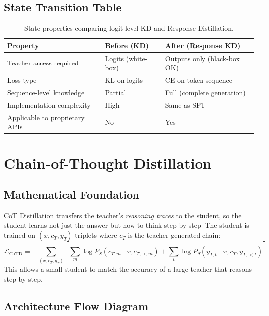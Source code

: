 \subsection{State Transition Table}
\begin{table}[h]\centering
\begin{tabular}{lll}\toprule
\textbf{Property} & \textbf{Before (KD)} & \textbf{After (Response KD)}\\\midrule
Teacher access required & Logits (white-box) & Outputs only (black-box OK)\\
Loss type & KL on logits & CE on token sequence\\
Sequence-level knowledge & Partial & Full (complete generation)\\
Implementation complexity & High & Same as SFT\\
Applicable to proprietary APIs & No & Yes\\\bottomrule
\end{tabular}
\caption{State properties comparing logit-level KD and Response Distillation.}
\end{table}

\newpage
\section{Chain-of-Thought Distillation}

\subsection{Mathematical Foundation}
CoT Distillation transfers the teacher's \emph{reasoning traces} to the student, so the student learns not just the answer but how to think step by step. The student is trained on $(x, c_T, y_T)$ triplets where $c_T$ is the teacher-generated chain:
\begin{equation}
  \mathcal{L}_{\text{CoTD}} = -\sum_{(x,c_T,y_T)} \left[\sum_m \log P_S(c_{T,m} \mid x, c_{T,<m}) + \sum_t \log P_S(y_{T,t} \mid x, c_T, y_{T,<t})\right]
\end{equation}
This allows a small student to match the accuracy of a large teacher that reasons step by step.

\subsection{Architecture Flow Diagram}

